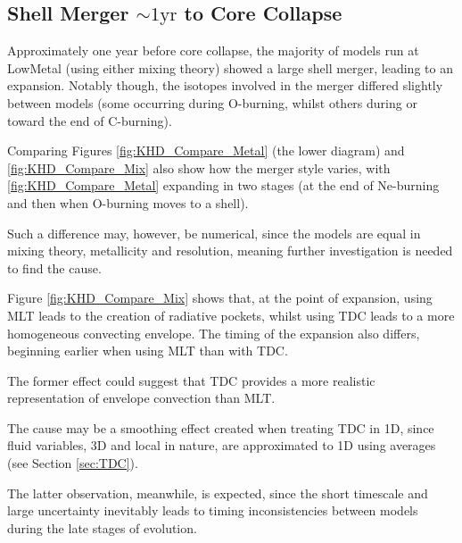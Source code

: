\subsection{Shell Merger $\sim 1\mathrm{yr}$ to Core Collapse}\label{sec:CNOMerge}

Approximately one year before core collapse, the majority of models run at \gls{LowMetal} (using either mixing theory) showed a large shell merger, leading to an expansion. Notably though, the isotopes involved in the merger differed slightly between models (some occurring during O-burning, whilst others during or toward the end of C-burning).

Comparing Figures \ref{fig:KHD_Compare_Metal} (the lower diagram) and \ref{fig:KHD_Compare_Mix} also show how the merger style varies, with \ref{fig:KHD_Compare_Metal} expanding in two stages (at the end of Ne-burning and then when O-burning moves to a shell). 

Such a difference may, however, be numerical, since the models are equal in mixing theory, metallicity and resolution, meaning further investigation is needed to find the cause.

Figure \ref{fig:KHD_Compare_Mix} shows that, at the point of expansion, using \gls{MLT} leads to the creation of radiative pockets, whilst using \gls{TDC} leads to a more homogeneous convecting envelope. The timing of the expansion also differs, beginning earlier when using \gls{MLT} than with \gls{TDC}. 

The former effect could suggest that \gls{TDC} provides a more realistic representation of envelope convection than \gls{MLT}. 

The cause may be a smoothing effect created when treating \gls{TDC} in 1D, since fluid variables, 3D and local in nature, are approximated to 1D using averages (see Section \ref{sec:TDC}). 

The latter observation, meanwhile, is expected, since the short timescale and large uncertainty inevitably leads to timing inconsistencies between models during the late stages of evolution. 

